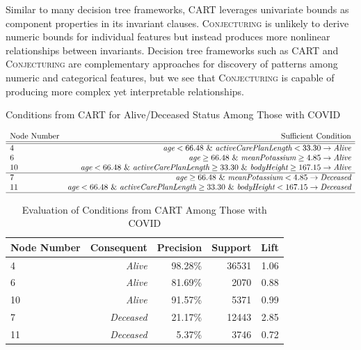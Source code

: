 \documentclass[ijds,nonblindrev]{informs-ijds}
\begin{document}
Similar to many decision tree frameworks, CART leverages univariate bounds as component properties in its invariant clauses.  \textsc{Conjecturing} is unlikely to derive numeric bounds for individual features but instead produces more nonlinear relationships between invariants.  Decision tree frameworks such as CART and \textsc{Conjecturing} are complementary approaches for discovery of patterns among numeric and categorical features, but we see that \textsc{Conjecturing} is capable of producing more complex yet interpretable relationships.


\begin{table}[!ht]
\caption{\label{cart}Conditions from CART for Alive/Deceased Status Among Those with COVID}
\[
\begin{array}{lr}
\textrm{Node Number} & \textrm{Sufficient Condition} \\
\hline
\hline
4 & \textit{age} < 66.48 \ \& \ \textit{activeCarePlanLength} < 33.30 \rightarrow  \textit{Alive}\\
6 & \textit{age} \geq 66.48 \ \& \ \textit{meanPotassium} \geq 4.85 \rightarrow  \textit{Alive}\\
10 & \textit{age} < 66.48 \ \& \ \textit{activeCarePlanLength} \geq 33.30 \ \& \ \textit{bodyHeight} \geq 167.15 \rightarrow  \textit{Alive}\\
\hline
7 & \textit{age} \geq 66.48 \ \& \ \textit{meanPotassium} < 4.85 \rightarrow  \textit{Deceased}\\
11 & \textit{age} < 66.48 \ \& \ \textit{activeCarePlanLength} \geq 33.30 \ \& \ \textit{bodyHeight} < 167.15 \rightarrow  \textit{Deceased} \\ \hline
\end{array}
\]
\end{table}

\begin{table}[!ht]
\begin{center}
\caption{\label{cartstats}Evaluation of Conditions from CART Among Those with COVID}
\begin{tabular}{lrrrr}
Node Number & Consequent & Precision & Support & Lift \\
\hline
4  & \textit{Alive}   & 98.28\%   & 36531 & 1.06 \\
6  & \textit{Alive}   & 81.69\%   & 2070 & 0.88 \\
10 & \textit{Alive}   & 91.57\%   & 5371 & 0.99 \\
\hline
7  & \textit{Deceased}& 21.17\%   & 12443 & 2.85 \\
11 & \textit{Deceased}& 5.37\%    & 3746 & 0.72 \\ \hline
\end{tabular}

\end{center}
\end{table}
\end{document}
